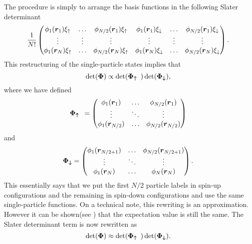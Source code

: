         The procedure is simply to arrange the basis functions in the following
        Slater determinant
            \begin{equation}
                \frac{1}{N!} \begin{pmatrix}
                    \phi_1(\boldsymbol{{r}}_1)\xi_{\uparrow} & \dots &
                    \phi_{N/2}(\boldsymbol{{r}}_1)\xi_{\uparrow} &
                    \phi_1(\boldsymbol{{r}}_1)\xi_{\downarrow} & \dots &
                    \phi_{N/2}(\boldsymbol{{r}}_1)\xi_{\downarrow} \\
                    \vdots & \vdots & \vdots & \vdots & \vdots & \vdots \\
                    \phi_1(\boldsymbol{{r}}_N)\xi_{\uparrow} & \dots &
                    \phi_{N/2}(\boldsymbol{{r}}_N)\xi_{\uparrow} &
                    \phi_1(\boldsymbol{{r}}_N)\xi_{\downarrow} & \dots &
                    \phi_{N/2}(\boldsymbol{{r}}_N)\xi_{\downarrow}
                \end{pmatrix}.
            \end{equation}
        This restructuring of the single-particle states implies that
            \begin{equation}
                \det(\boldsymbol{{\Phi}}) \propto \det(\boldsymbol{{\Phi_{\uparrow}}})
                \det(\boldsymbol{{\Phi_{\downarrow}}}),
            \end{equation}
        where we have defined
            \begin{equation}
                    \boldsymbol{{\Phi_{\uparrow}}} = \begin{pmatrix}
                        \phi_1(\boldsymbol{{r}}_1) & \dots & \phi_{N/2}(\boldsymbol{{r}}_1) \\
                        \vdots & \ddots & \vdots \\
                        \phi_1(\boldsymbol{{r}}_{N/2}) & \dots &
                        \phi_{N/2}(\boldsymbol{{r}}_{N/2})
                    \end{pmatrix}
            \end{equation}
        and
            \begin{equation}
                \boldsymbol{{\Phi_{\downarrow}}} = \begin{pmatrix}
                    \phi_1(\boldsymbol{{r}}_{N/2+1}) & \dots &
                    \phi_{N/2}(\boldsymbol{{r}}_{N/2+1}) \\
                    \vdots & \ddots & \vdots \\
                    \phi_1(\boldsymbol{{r}}_{N}) & \dots & \phi_{N}(\boldsymbol{{r}}_{N})
                \end{pmatrix}.
            \end{equation}
        This essentially says that we put the first $N/2$ particle labels in
        spin-up configurations and the remaining in spin-down configurations
        and use the same single-particle functions.  On a technical note, this
        rewriting is an approximation. However it can be shown(see
        \cite{splitDet}) that the expectation value is still the same. The
        Slater determinant term is now rewritten as
            \begin{equation}
                \det(\boldsymbol{{\Phi}}) \approx \det(\boldsymbol{{\Phi_{\uparrow}}})
                \det(\boldsymbol{{\Phi_{\downarrow}}}).
                \label{eq:slatersplitdef}
            \end{equation}

